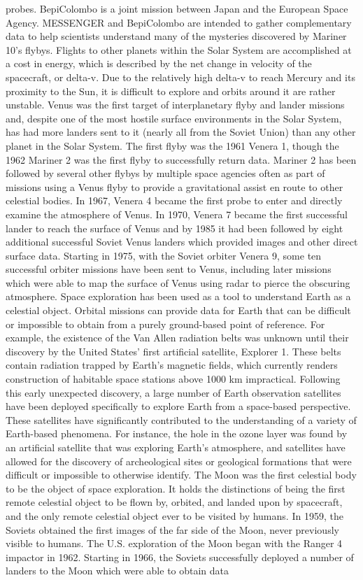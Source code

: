 \documentclass[12pt]{article}
\begin{document}
probes. BepiColombo is a joint mission between Japan and the European Space Agency. MESSENGER and BepiColombo are intended to gather complementary data to help scientists understand many of the mysteries discovered by Mariner 10's flybys. Flights to other planets within the Solar System are accomplished at a cost in energy, which is described by the net change in velocity of the spacecraft, or delta-v. Due to the relatively high delta-v to reach Mercury and its proximity to the Sun, it is difficult to explore and orbits around it are rather unstable. Venus was the first target of interplanetary flyby and lander missions and, despite one of the most hostile surface environments in the Solar System, has had more landers sent to it (nearly all from the Soviet Union) than any other planet in the Solar System. The first flyby was the 1961 Venera 1, though the 1962 Mariner 2 was the first flyby to successfully return data. Mariner 2 has been followed by several other flybys by multiple space agencies often as part of missions using a Venus flyby to provide a gravitational assist en route to other celestial bodies. In 1967, Venera 4 became the first probe to enter and directly examine the atmosphere of Venus. In 1970, Venera 7 became the first successful lander to reach the surface of Venus and by 1985 it had been followed by eight additional successful Soviet Venus landers which provided images and other direct surface data. Starting in 1975, with the Soviet orbiter Venera 9, some ten successful orbiter missions have been sent to Venus, including later missions which were able to map the surface of Venus using radar to pierce the obscuring atmosphere. Space exploration has been used as a tool to understand Earth as a celestial object. Orbital missions can provide data for Earth that can be difficult or impossible to obtain from a purely ground-based point of reference. For example, the existence of the Van Allen radiation belts was unknown until their discovery by the United States' first artificial satellite, Explorer 1. These belts contain radiation trapped by Earth's magnetic fields, which currently renders construction of habitable space stations above 1000 km impractical. Following this early unexpected discovery, a large number of Earth observation satellites have been deployed specifically to explore Earth from a space-based perspective. These satellites have significantly contributed to the understanding of a variety of Earth-based phenomena. For instance, the hole in the ozone layer was found by an artificial satellite that was exploring Earth's atmosphere, and satellites have allowed for the discovery of archeological sites or geological formations that were difficult or impossible to otherwise identify. The Moon was the first celestial body to be the object of space exploration. It holds the distinctions of being the first remote celestial object to be flown by, orbited, and landed upon by spacecraft, and the only remote celestial object ever to be visited by humans. In 1959, the Soviets obtained the first images of the far side of the Moon, never previously visible to humans. The U.S. exploration of the Moon began with the Ranger 4 impactor in 1962. Starting in 1966, the Soviets successfully deployed a number of landers to the Moon which were able to obtain data 
\end{document}
